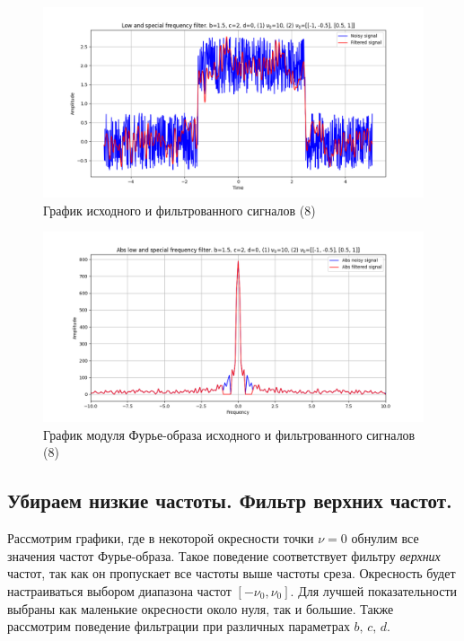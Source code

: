 \documentclass[a4paper, 12pt]{article}
\begin{document}
    \begin{figure}[H]
        \centering
        \includegraphics[scale=0.48]{8_3_u_flt_u_nospec.png}
        \captionsetup{skip=0pt}
        \caption{График исходного и фильтрованного сигналов (8)}
        \label{fig:snf}
    \end{figure}
    \begin{figure}[!htb]
        \centering
        \includegraphics[scale=0.48]{8_3_abs_u_U_nospec.png}
        \captionsetup{skip=0pt}
        \caption{График модуля Фурье-образа исходного и фильтрованного сигналов (8)}
        \label{fig:wkljkf}
    \end{figure}


    \subsection{Убираем низкие частоты. Фильтр верхних частот.}
    Рассмотрим графики, где в некоторой окресности точки $\nu=0$ обнулим все значения частот Фурье-образа.
    Такое поведение соответствует фильтру \textit{верхних} частот, так как он пропускает все частоты выше частоты среза.
    Окресность будет настраиваться выбором диапазона частот $[-\nu_0,\nu_0]$. Для лучшей показательности выбраны как маленькие
    окресности около нуля, так и большие. Также рассмотрим поведение фильтрации при различных параметрах $b,\,c,\,d$.
\end{document}
